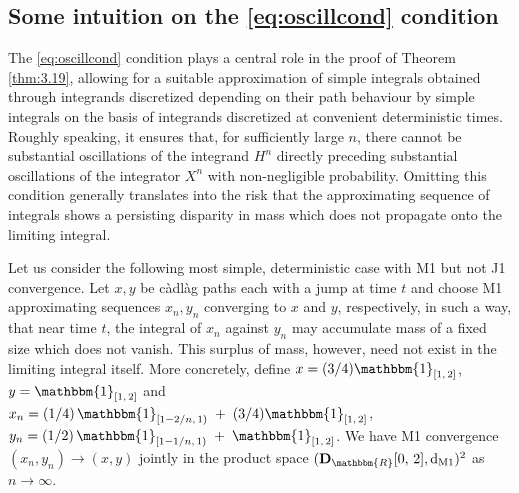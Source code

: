 \documentclass[11pt]{article}
\theoremstyle{definition}\newtheorem{example}[theorem]{Example}
\theoremstyle{definition}\newtheorem{counterexample}[theorem]{Counterexample}
\theoremstyle{definition}\newtheorem{remark}[theorem]{Remark}
\theoremstyle{definition}\newtheorem{defi}[theorem]{Definition}
\numberwithin{equation}{section}
\newcommand{\D}{{\bf D}}											%
\newcommand*\diff{\mathop{}\!\mathrm{d}}								%
\renewcommand{\|}{\; : \, \;}											%
\begin{document}
\subsection{Some intuition on the \eqref{eq:oscillcond} condition}\label{subsect:AVCO_discussion}

The \eqref{eq:oscillcond} condition plays a central role in the proof of Theorem \ref{thm:3.19}, allowing for a suitable approximation of simple integrals obtained through integrands discretized depending on their path behaviour by simple integrals on the basis of integrands discretized at convenient deterministic times. Roughly speaking, it ensures that, for sufficiently large $n$, there cannot be substantial oscillations of the integrand $H^n$ directly preceding substantial oscillations of the integrator $X^n$ with non-negligible probability. Omitting this condition generally translates into the risk that the approximating sequence of integrals shows a persisting disparity in mass which does not propagate onto the limiting integral.

Let us consider the following most simple, deterministic case with M1 but not J1 convergence. Let $x,y$ be càdlàg paths each with a jump at time $t$ and choose M1 approximating sequences $x_n, y_n$ converging to $x$ and $y$, respectively, in such a way, that near time $t$, the integral of $x_n$ against $y_n$ may accumulate mass of a fixed size which does not vanish. This surplus of mass, however, need not exist in the limiting integral itself. More concretely, define $x=(3/4) \mathbbm{1}_{\left[1,\, 2\right]}$, $y= \mathbbm{1}_{\left[1,\, 2\right]}$ and $x_n=(1/4)\,  \mathbbm{1}_{\left[1-2/n,\,1 \right)} \; + \; (3/4) \mathbbm{1}_{\left[1,\, 2\right]}$, $y_n = (1/2)\,  \mathbbm{1}_{\left[1-1/n,\,1 \right)} \; + \; \mathbbm{1}_{\left[1,\, 2\right]}$. We have M1 convergence $(x_n,y_n) \to (x,y)$ jointly in the product space $(\D_{\mathbbm{R}}[0,\,2],\diff_{\text{M1}})^2$ as $n\to \infty$.
\end{document}
